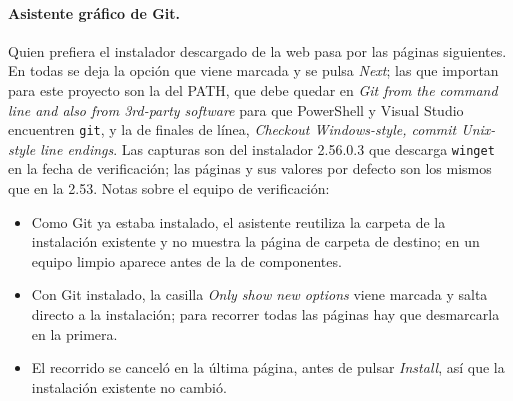 \documentclass[12pt,letterpaper]{article}
\begin{document}
\paragraph{Asistente gráfico de Git.} Quien prefiera el instalador descargado de la web pasa por las páginas siguientes. En todas se deja la opción que viene marcada y se pulsa \emph{Next}; las que importan para este proyecto son la del PATH, que debe quedar en \emph{Git from the command line and also from 3rd-party software} para que PowerShell y Visual Studio encuentren \texttt{git}, y la de finales de línea, \emph{Checkout Windows-style, commit Unix-style line endings}. Las capturas son del instalador 2.56.0.3 que descarga \texttt{winget} en la fecha de verificación; las páginas y sus valores por defecto son los mismos que en la 2.53. Notas sobre el equipo de verificación:
\begin{itemize}[itemsep=2pt]
  \item Como Git ya estaba instalado, el asistente reutiliza la carpeta de la instalación existente y no muestra la página de carpeta de destino; en un equipo limpio aparece antes de la de componentes.
  \item Con Git instalado, la casilla \emph{Only show new options} viene marcada y salta directo a la instalación; para recorrer todas las páginas hay que desmarcarla en la primera.
  \item El recorrido se canceló en la última página, antes de pulsar \emph{Install}, así que la instalación existente no cambió.
\end{itemize}
\end{document}
